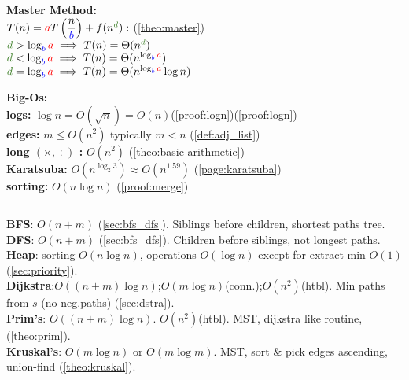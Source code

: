 \begin{minipage}{0.45\textwidth}
\textbf{Master Method:}\\

\vspace{-.5em}
\noindent
$T(n) = \textcolor{red}{a}T\left(\dfrac{n}{\textcolor{blue}{b}}\right) + f(n^{\textcolor{OliveGreen}{d}}):$ (\ref{theo:master})\\
$\textcolor{OliveGreen}{d} > \log_{\textcolor{blue}{b}} \textcolor{red}{a} \implies T(n) = \Theta(n^{\textcolor{OliveGreen}{d}})$\\
$\textcolor{OliveGreen}{d} < \log_{\textcolor{blue}{b}} \textcolor{red}{a} \implies T(n) = \Theta(n^{\log_{\textcolor{blue}{b}} \textcolor{red}{a}})$\\
$\textcolor{OliveGreen}{d} = \log_{\textcolor{blue}{b}} \textcolor{red}{a} \implies T(n) = \Theta(n^{\log_{\textcolor{blue}{b}} \textcolor{red}{a}} \log n)$\\
\end{minipage}
\hfill
\begin{minipage}{0.45\textwidth}
\textbf{Big-Os:}\\
\textbf{logs:} $\log n = O(\sqrt{n}) = O(n)$(\ref{proof:logn})(\ref{proof:logn})\\
\textbf{edges:} $m \leq O(n^2)$ typically $m<n$ (\ref{def:adj_list})\\
\textbf{long $(\times,\div)$ :} $O(n^2)$ (\ref{theo:basic-arithmetic})\\
\textbf{Karatsuba:} $O(n^{\log_2 3})\approx O(n^{1.59})$ (\ref{page:karatsuba})\\
\textbf{sorting:} $O(n\log n)$ (\ref{proof:merge})\\
\end{minipage}
\noindent\rule{\textwidth}{0.4pt}
\textbf{BFS}: $O(n+m)$ (\ref{sec:bfs_dfs}). Siblings before children, shortest paths tree.\\
\textbf{DFS}: $O(n+m)$ (\ref{sec:bfs_dfs}). Children before siblings, not longest paths.\\
\textbf{Heap}: sorting $O(n\log n)$, operations $O(\log n)$ except for extract-min $O(1)$ (\ref{sec:priority}).\\
\textbf{Dijkstra}:$O((n+m)\log n)$;$O(m \log n)$(conn.);$O(n^2)$(htbl). Min paths from $s$ (no neg.paths) (\ref{sec:dstra}).\\
\textbf{Prim's}: $O((n+m)\log n)$. $O(n^2)$(htbl). MST, dijkstra like routine, (\ref{theo:prim}).\\
\textbf{Kruskal's}: $O(m \log n)$ or $O(m \log m)$. MST, sort \& pick edges ascending, union-find (\ref{theo:kruskal}).\\
